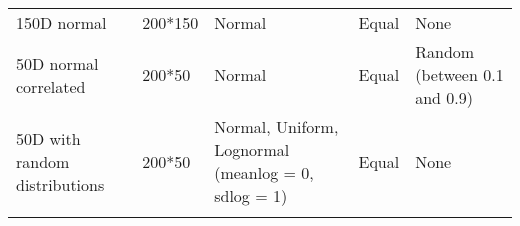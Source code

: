 \documentclass[]{article}
\begin{document}
\begin{longtable}[]{@{}lllll@{}}
\begin{minipage}[t]{0.12\columnwidth}
150D normal\strut
\end{minipage} & \begin{minipage}[t]{0.08\columnwidth}\raggedright\strut
200*150\strut
\end{minipage} & \begin{minipage}[t]{0.31\columnwidth}\raggedright\strut
Normal\strut
\end{minipage} & \begin{minipage}[t]{0.21\columnwidth}\raggedright\strut
Equal\strut
\end{minipage} & \begin{minipage}[t]{0.13\columnwidth}\raggedright\strut
None\strut
\end{minipage}\tabularnewline
\begin{minipage}[t]{0.12\columnwidth}\raggedright\strut
50D normal correlated\strut
\end{minipage} & \begin{minipage}[t]{0.08\columnwidth}\raggedright\strut
200*50\strut
\end{minipage} & \begin{minipage}[t]{0.31\columnwidth}\raggedright\strut
Normal\strut
\end{minipage} & \begin{minipage}[t]{0.21\columnwidth}\raggedright\strut
Equal\strut
\end{minipage} & \begin{minipage}[t]{0.13\columnwidth}\raggedright\strut
Random (between 0.1 and 0.9)\strut
\end{minipage}\tabularnewline
\begin{minipage}[t]{0.12\columnwidth}\raggedright\strut
50D with random distributions\strut
\end{minipage} & \begin{minipage}[t]{0.08\columnwidth}\raggedright\strut
200*50\strut
\end{minipage} & \begin{minipage}[t]{0.31\columnwidth}\raggedright\strut
Normal, Uniform, Lognormal (meanlog = 0, sdlog = 1)\strut
\end{minipage} & \begin{minipage}[t]{0.21\columnwidth}\raggedright\strut
Equal\strut
\end{minipage} & \begin{minipage}[t]{0.13\columnwidth}\raggedright\strut
None\strut
\end{minipage}\tabularnewline
\begin{minipage}[t]{0.12\columnwidth}\raggedright\strut

\end{minipage}
\end{longtable}
\end{document}

